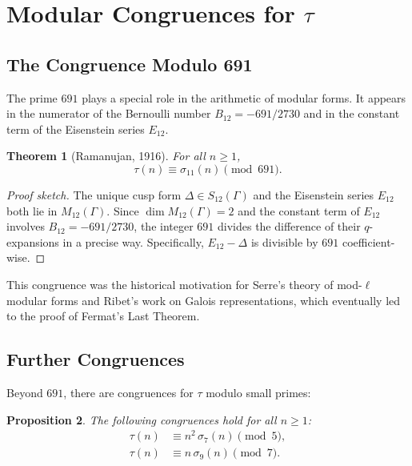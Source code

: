 \documentclass[12pt,a4paper]{amsart}
\newtheorem{theorem}{Theorem}[section]
\newtheorem{proposition}[theorem]{Proposition}
\theoremstyle{definition}
\begin{document}
\section{Modular Congruences for $\tau$}

\subsection{The Congruence Modulo 691}

The prime $691$ plays a special role in the arithmetic of modular forms. It appears
in the numerator of the Bernoulli number $B_{12} = -691/2730$ and in the constant
term of the Eisenstein series $E_{12}$.

\begin{theorem}[Ramanujan, 1916]\label{thm:cong-691}
  For all $n \geq 1$,
  \[
    \tau(n) \equiv \sigma_{11}(n) \pmod{691}.
  \]
\end{theorem}

\begin{proof}[Proof sketch]
  The unique cusp form $\Delta \in S_{12}(\Gamma)$ and the Eisenstein series
  $E_{12}$ both lie in $M_{12}(\Gamma)$. Since $\dim M_{12}(\Gamma) = 2$ and the
  constant term of $E_{12}$ involves $B_{12} = -691/2730$, the integer
  $691$ divides the difference of their $q$-expansions in a precise way.
  Specifically, $E_{12} - \Delta$ is divisible by $691$ coefficient-wise.
\end{proof}

This congruence was the historical motivation for Serre's theory of
mod-$\ell$ modular forms and Ribet's work on Galois representations, which
eventually led to the proof of Fermat's Last Theorem.

\subsection{Further Congruences}

Beyond $691$, there are congruences for $\tau$ modulo small primes:

\begin{proposition}\label{prop:small-prime-cong}
  The following congruences hold for all $n \geq 1$:
  \begin{align}
    \tau(n) &\equiv n^2\,\sigma_7(n) \pmod{5}, \label{eq:cong5}\\
    \tau(n) &\equiv n\,\sigma_9(n) \pmod{7}. \label{eq:cong7}
  \end{align}
\end{proposition}
\end{document}
